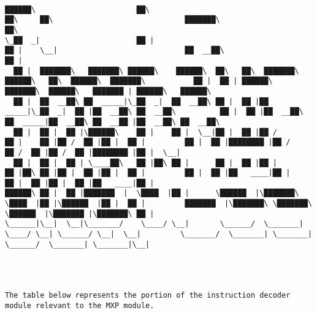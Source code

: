 \documentclass[varwidth=\maxdimen,margin=0.5cm,multi={verbatim}]{standalone}
\begin{document}
\begin{verbatim}

██████\                       ██\                                     ██\     ██\                              ███████\                                      ██\
\_██  _|                      ██ |                                    ██ |    \__|                             ██  __██\                                     ██ |
  ██ |  ███████\   ███████\ ██████\    ██████\  ██\   ██\  ███████\ ██████\   ██\  ██████\  ███████\           ██ |  ██ | ██████\   ███████\  ██████\   ███████ | ██████\   ██████\
  ██ |  ██  __██\ ██  _____|\_██  _|  ██  __██\ ██ |  ██ |██  _____|\_██  _|  ██ |██  __██\ ██  __██\          ██ |  ██ |██  __██\ ██  _____|██  __██\ ██  __██ |██  __██\ ██  __██\
  ██ |  ██ |  ██ |\██████\    ██ |    ██ |  \__|██ |  ██ |██ /        ██ |    ██ |██ /  ██ |██ |  ██ |         ██ |  ██ |████████ |██ /      ██ /  ██ |██ /  ██ |████████ |██ |  \__|
  ██ |  ██ |  ██ | \____██\   ██ |██\ ██ |      ██ |  ██ |██ |        ██ |██\ ██ |██ |  ██ |██ |  ██ |         ██ |  ██ |██   ____|██ |      ██ |  ██ |██ |  ██ |██   ____|██ |
██████\ ██ |  ██ |███████  |  \████  |██ |      \██████  |\███████\   \████  |██ |\██████  |██ |  ██ |         ███████  |\███████\ \███████\ \██████  |\███████ |\███████\ ██ |
\______|\__|  \__|\_______/    \____/ \__|       \______/  \_______|   \____/ \__| \______/ \__|  \__|         \_______/  \_______| \_______| \______/  \_______| \_______|\__|




The table below represents the portion of the instruction decoder module relevant to the MXP module.



\end{verbatim}
\end{document}
